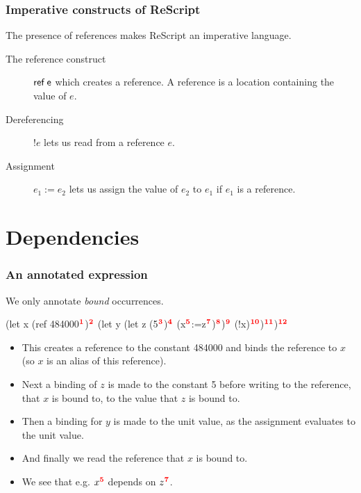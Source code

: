 \documentclass{beamer}
\begin{document}
\begin{frame}
  \frametitle{Imperative constructs of ReScript}
  
  The presence of references makes ReScript an imperative language.

  \begin{description}
    \item[The reference construct] $\textsf{ref\;e}$ which creates a
      reference. A reference is a location containing the value of $e$.

    \item[Dereferencing] $!e$ lets us read from a reference $e$.

    \item[Assignment] $e_1 := e_2$ lets us assign the value of $e_2$
      to $e_1$ if $e_1$ is a reference.
\end{description}


\end{frame}

\section{Dependencies}

\begin{frame}[fragile]
  \frametitle{An annotated expression}

    We only annotate \emph{bound} occurrences.

  \begin{rescript}
   (let x (ref 484000$\mathbf{\textcolor{red}{^{1}}}$)$\mathbf{\textcolor{red}{^{2}}}$
     (let y (let z (5$\mathbf{\textcolor{red}{^{3}}}$)$\mathbf{\textcolor{red}{^{4}}}$
        (x$\mathbf{\textcolor{red}{^{5}}}$:=z$\mathbf{\textcolor{red}{^{7}}}$)$\mathbf{\textcolor{red}{^{8}}}$)$\mathbf{\textcolor{red}{^{9}}}$ (!x)$\mathbf{\textcolor{red}{^{10}}}$)$\mathbf{\textcolor{red}{^{11}}}$)$\mathbf{\textcolor{red}{^{12}}}$
\end{rescript}

\begin{itemize}
\item<1->This creates a reference to the constant 484000 and binds the reference to
  $x$ (so $x$ is an alias of this reference).
\item<2-> Next a binding of $z$ is made
to the constant 5 before writing to the reference, that $x$ is bound to, 
to the value that $z$ is bound to.
\item<3-> Then a binding for $y$ is made to the unit value,
  as the assignment evaluates to the unit value.
\item<4-> And finally we read the reference that $x$ is bound to.
\item<5-> We see that e.g. $x\mathbf{\textcolor{red}{^{5}}}$ depends on $z\mathbf{\textcolor{red}{^{7}}}$.
\end{itemize}

\end{frame}
\end{document}
